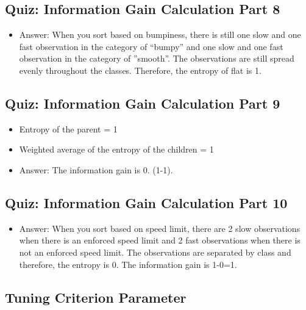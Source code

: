 \documentclass[12pt]{report}
\begin{document}
\subsection{Quiz: Information Gain Calculation Part 8}

\begin{itemize}

\item Answer: When you sort based on bumpiness, there is still one slow and one fast observation in the category of ``bumpy'' and one slow and one fast observation in the category of ''smooth''. The observations are still spread evenly throughout the classes. Therefore, the entropy of flat is 1. 


\end{itemize}

\subsection{Quiz: Information Gain Calculation Part 9}

\begin{itemize}

\item Entropy of the parent = 1

\item Weighted average of the entropy of the children = 1

\item Answer: The information gain is 0. (1-1). 

\end{itemize}

\subsection{Quiz: Information Gain Calculation Part 10}

\begin{itemize}

\item Answer: When you sort based on speed limit, there are 2 slow observations when there is an enforced speed limit and 2 fast observations when there is not an enforced speed limit. The observations are separated by class and therefore, the entropy is 0. The information gain is 1-0=1. 

\end{itemize}

\subsection{Tuning Criterion Parameter}
\end{document}
